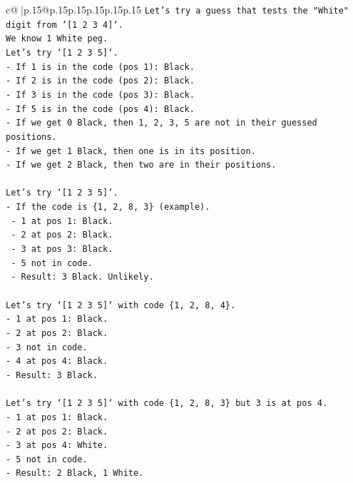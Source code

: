 \documentclass{article}
\begin{document}
{\begin{supertabular}{c@{$\;$}|p{.15\linewidth}@{}p{.15\linewidth}p{.15\linewidth}p{.15\linewidth}p{.15\linewidth}p{.15\linewidth}}
{{{\texttt{Let's try a guess that tests the "White" digit from `{[}1 2 3 4{]}`.} \\
\texttt{We know 1 White peg.} \\
\texttt{Let's try `{[}1 2 3 5{]}`.} \\
\texttt{{-} If 1 is in the code (pos 1): Black.} \\
\texttt{{-} If 2 is in the code (pos 2): Black.} \\
\texttt{{-} If 3 is in the code (pos 3): Black.} \\
\texttt{{-} If 5 is in the code (pos 4): Black.} \\
\texttt{{-} If we get 0 Black, then 1, 2, 3, 5 are not in their guessed positions.} \\
\texttt{{-} If we get 1 Black, then one is in its position.} \\
\texttt{{-} If we get 2 Black, then two are in their positions.} \\
\\ 
\texttt{Let's try `{[}1 2 3 5{]}`.} \\
\texttt{{-} If the code is \{1, 2, 8, 3\} (example).} \\
\texttt{  {-} 1 at pos 1: Black.} \\
\texttt{  {-} 2 at pos 2: Black.} \\
\texttt{  {-} 3 at pos 3: Black.} \\
\texttt{  {-} 5 not in code.} \\
\texttt{  {-} Result: 3 Black. Unlikely.} \\
\\ 
\texttt{Let's try `{[}1 2 3 5{]}` with code \{1, 2, 8, 4\}.} \\
\texttt{{-} 1 at pos 1: Black.} \\
\texttt{{-} 2 at pos 2: Black.} \\
\texttt{{-} 3 not in code.} \\
\texttt{{-} 4 at pos 4: Black.} \\
\texttt{{-} Result: 3 Black.} \\
\\ 
\texttt{Let's try `{[}1 2 3 5{]}` with code \{1, 2, 8, 3\} but 3 is at pos 4.} \\
\texttt{{-} 1 at pos 1: Black.} \\
\texttt{{-} 2 at pos 2: Black.} \\
\texttt{{-} 3 at pos 4: White.} \\
\texttt{{-} 5 not in code.} \\
\texttt{{-} Result: 2 Black, 1 White.} \\
}}}
\end{supertabular}}
\end{document}
